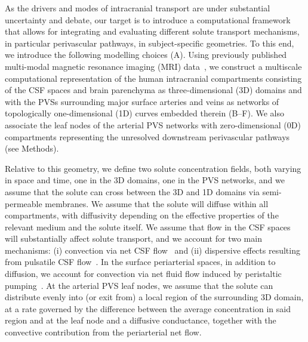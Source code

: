 \documentclass[fleqn,10pt]{wlscirep}
\begin{document}


As the drivers and modes of intracranial transport are under
substantial uncertainty and debate\cite{smith2019going,
  proulx2021cerebrospinal, bohr2022glymphatic, hladky2022glymphatic,
  betsholtz2024advances, kipnis2025resolving}, our target is to
introduce a computational framework that allows for integrating and
evaluating different solute transport mechanisms, in particular
perivascular pathways, in subject-specific geometries. To this end, we
introduce the following modelling choices
(A). Using previously published multi-modal
magnetic resonance imaging (MRI) data~\cite{hodneland2019new,
  deistung2009tof, schweser2012quantitative, reichenbach2012future,
  deistung2017overview}, we construct a multiscale computational
representation of the human intracranial compartments consisting of
the CSF spaces and brain parenchyma as three-dimensional (3D) domains
and with the PVSs surrounding major surface arteries and veins as
networks of topologically one-dimensional (1D) curves embedded therein
(B--F). We also associate the leaf nodes of the arterial PVS
networks with zero-dimensional (0D) compartments representing the
unresolved downstream perivascular pathways (see Methods).

Relative to this geometry, we define two
solute concentration fields, both varying in space and time, one in
the 3D domains, one in the PVS networks, and we assume that the solute
can cross between the 3D and 1D domains via semi-permeable
membranes. We assume that the solute will diffuse within all
compartments, with diffusivity depending on the effective properties
of the relevant medium and the solute
itself\cite{sykova2008diffusion}. We assume that flow in the CSF
spaces will substantially affect solute transport, and we account for
two main mechanisms: (i) convection via net CSF
flow~\cite{hornkjol2022csf} and (ii) dispersive effects resulting from
pulsatile CSF flow~\cite{sweetman2011cerebrospinal,
  vinje2019respiratory, ray2021quantitative}. In the surface
periarterial spaces, in addition to diffusion, we account for
convection via net fluid flow induced by peristaltic pumping~\cite{mestre2018flow, gjerde2023directional}. At the arterial PVS leaf nodes, we assume that the solute can distribute evenly into (or exit from) a local region of the surrounding 3D domain, at a rate governed by the difference between the average concentration in said region and at the leaf node and a diffusive conductance, together with the convective contribution from the periarterial net flow.
\end{document}
